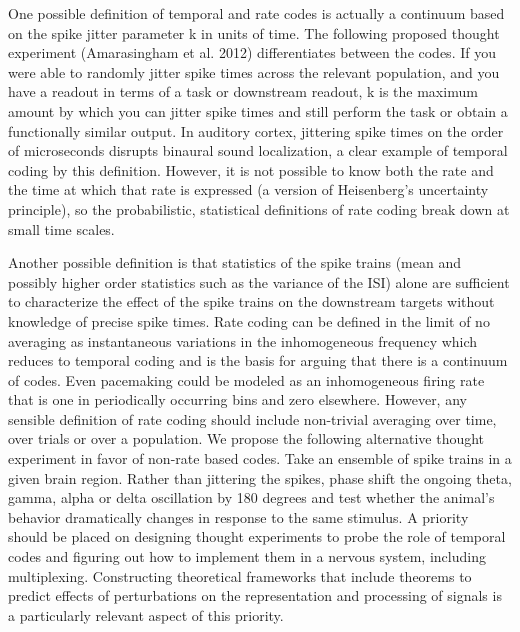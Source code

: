 \documentclass[12pt]{article}
\begin{document}
One possible definition of temporal and rate codes is actually a continuum based on the spike jitter parameter k in units of time. The following proposed thought experiment
(Amarasingham et al. 2012) differentiates between the codes. If you were able to randomly jitter spike times across the relevant population, and you have a readout in terms of
a task or downstream readout, k is the maximum amount by which you can jitter spike times and still perform the task or obtain a functionally similar output. In auditory
cortex, jittering spike times on the order of microseconds disrupts binaural sound localization, a clear example of temporal coding by this definition. However, it is not
possible to know both the rate and the time at which that rate is expressed (a version of Heisenberg’s uncertainty principle), so the probabilistic, statistical definitions of
rate coding break down at small time scales.

Another possible definition is that statistics of the spike trains (mean and possibly higher order statistics such as the variance of the ISI) alone are sufficient to
characterize the effect of the spike trains on the downstream targets without knowledge of precise spike times. Rate coding can be defined in the limit of no averaging as
instantaneous variations in the inhomogeneous frequency which reduces to temporal coding and is the basis for arguing that there is a continuum of codes. Even pacemaking could
be modeled as an inhomogeneous firing rate that is one in periodically occurring bins and zero elsewhere. However, any sensible definition of rate coding should include
non-trivial averaging over time, over trials or over a population. We propose the following alternative thought experiment in favor of non-rate based codes. Take an ensemble
of spike trains in a given brain region. Rather than jittering the spikes, phase shift the ongoing theta, gamma, alpha or delta oscillation by 180 degrees and test whether the
animal’s behavior dramatically changes in response to the same stimulus. A priority should be placed on designing thought experiments to probe the role of temporal codes and
figuring out how to implement them in a nervous system, including multiplexing. Constructing theoretical frameworks that include theorems to predict effects of perturbations
on the representation and processing of signals is a particularly relevant aspect of this priority.
\end{document}
